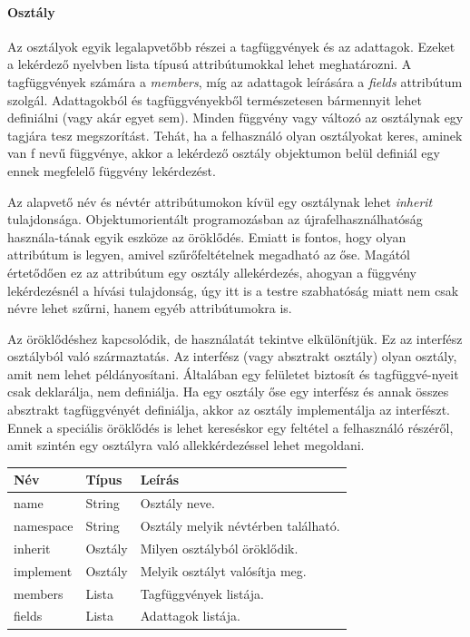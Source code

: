 \documentclass[a4paper,12pt]{report}
\begin{document}
\paragraph{Osztály}
Az osztályok egyik legalapvetőbb részei a tagfüggvények és az adattagok. Ezeket a lekérdező nyelvben lista típusú attribútumokkal lehet meghatározni. A tagfüggvények számára a \textit{members}, míg az adattagok leírására a \textit{fields} attribútum szolgál. Adattagokból és tagfüggvényekből természetesen bármennyit lehet definiálni (vagy akár egyet sem). Minden függvény vagy változó az osztálynak egy tagjára tesz megszorítást. Tehát, ha a felhasználó olyan osztályokat keres, aminek van f nevű függvénye, akkor a lekérdező osztály objektumon belül definiál egy ennek megfelelő függvény lekérdezést.
\par Az alapvető név és névtér attribútumokon kívül egy osztálynak lehet \textit{inherit} tulajdonsága. Objektumorientált programozásban az újrafelhasználhatóság használa-tának egyik eszköze az öröklődés. Emiatt is fontos, hogy olyan attribútum is legyen, amivel szűrőfeltételnek megadható az őse. Magától értetődően ez az attribútum egy osztály allekérdezés, ahogyan a függvény lekérdezésnél a hívási tulajdonság, úgy itt is a testre szabhatóság miatt nem csak névre lehet szűrni, hanem egyéb attribútumokra is.
\par Az öröklődéshez kapcsolódik, de használatát tekintve elkülönítjük. Ez az interfész osztályból való származtatás. Az interfész (vagy absztrakt osztály) olyan osztály, amit nem lehet példányosítani. Általában egy felületet biztosít és tagfüggvé-nyeit csak deklarálja, nem definiálja. Ha egy osztály őse egy interfész és annak összes absztrakt tagfüggvényét definiálja, akkor az osztály implementálja az interfészt. Ennek a speciális öröklődés is lehet kereséskor egy feltétel a felhasználó részéről, amit szintén egy osztályra való allekkérdezéssel lehet megoldani.
\begin{center}
	\begin{tabular}{| l | l | l |}
		\hline
		Név & Típus & Leírás \\ \hline
		name & String & Osztály neve. \\ \hline
		namespace & String & Osztály melyik névtérben található. \\ \hline
		inherit & Osztály & Milyen osztályból öröklődik. \\ \hline
		implement & Osztály & Melyik osztályt valósítja meg. \\ \hline
		members & Lista & Tagfüggvények listája. \\ \hline
		fields & Lista & Adattagok listája. \\ \hline
	\end{tabular}
\end{center}
\end{document}
